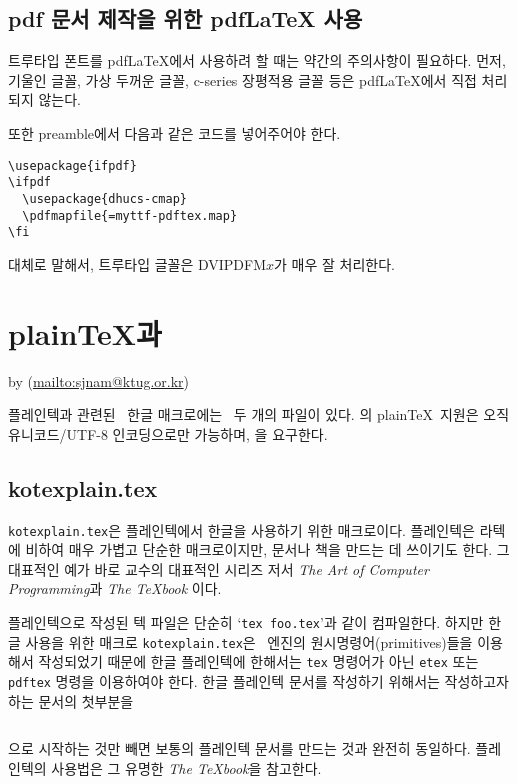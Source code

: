 \section{pdf 문서 제작을 위한 pdf\LaTeX{} 사용}

트루타입 폰트를 pdf\LaTeX 에서 사용하려 할 때는 약간의 주의사항이
필요하다. 먼저, 기울인 글꼴, 가상 두꺼운 글꼴, c-series 장평적용 글꼴 등은
pdf\LaTeX 에서 직접 처리되지 않는다.

또한 preamble에서 다음과 같은 코드를 넣어주어야 한다.
\begin{verbatim}
\usepackage{ifpdf}
\ifpdf
  \usepackage{dhucs-cmap}
  \pdfmapfile{=myttf-pdftex.map}
\fi
\end{verbatim}

대체로 말해서, 트루타입 글꼴은 DVIPDFM$x$가 매우 잘 처리한다. 

\chapter{plain\protect\TeX 과 \kotex}

\hfill\begin{minipage}{.5\linewidth}
\footnotesize\sffamily
by (\url{mailto:sjnam@ktug.or.kr})
\end{minipage}

\bigskip

\def\kotexplain{{\tt kotexplain.tex}}
\def\hangulcweb{{\tt hangulcweb.tex}}

\noindent 플레인텍과 관련된 \kotex\ 한글 매크로에는 \kotexplain과 \hangulcweb\ 두 개의
파일이 있다. \kotex 의 plain\TeX\ 지원은 오직 유니코드/UTF-8 인코딩으로만
가능하며, \eTeX 을 요구한다.

\section{kotexplain.tex}

\kotexplain 은 플레인텍에서 한글을 사용하기
위한 매크로이다. 플레인텍은 라텍에 비하여 매우 가볍고 단순한
매크로이지만, 문서나 책을 만드는 데 쓰이기도 한다.
그 대표적인 예가 바로  교수의 대표적인 시리즈 저서 {\sl The
Art of Computer Programming\/}과 {\sl The \TeX book\/} \cite{Knuth:1984:TB}이다.

플레인텍으로 작성된 텍 파일은 단순히 `{\tt tex foo.tex}'과 같이
컴파일한다. 하지만 한글 사용을 위한 매크로 \kotexplain 은 
\eTeX\ 엔진의 원시명령어(primitives)들을 이용해서 작성되었기 때문에
한글 플레인텍에 한해서는 {\tt tex} 명령어가 아닌 {\tt etex} 또는 {\tt
pdftex} 명령을 이용하여야 한다.  
한글 플레인텍 문서를 작성하기 위해서는 작성하고자 하는 문서의 첫부분을
\begin{verbatim}

\end{verbatim}
으로 시작하는 것만 빼면 보통의
플레인텍 문서를 만드는 것과 완전히 동일하다. 플레인텍의 사용법은 그
유명한 {\sl The \TeX book\/}을 참고한다.

